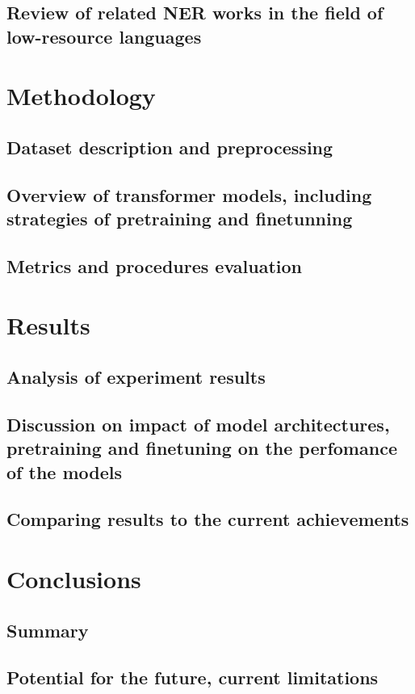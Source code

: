 \documentclass[a4paper,12pt]{report}
\begin{document}
\section{Review of related NER works in the field of low-resource languages}


\chapter{Methodology}
\section{Dataset description and preprocessing}
\section{Overview of transformer models, including strategies of pretraining and finetunning}
\section{Metrics and procedures evaluation}


\chapter{Results}
\section{Analysis of experiment results}
\section{Discussion on impact of model architectures, pretraining and finetuning on the perfomance of the models}
\section{Comparing results to the current achievements}


\chapter{Conclusions}
\section{Summary}
\section{Potential for the future, current limitations}



    
    
\end{document}
